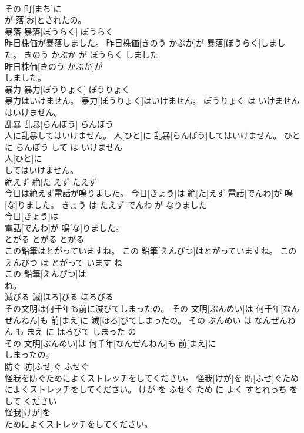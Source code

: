\documentclass[8pt]{extreport}
\begin{document}
\begin{CJK}{UTF8}{min}
\\	その 町[まち]に
\\	が 落[お]とされたの。			
\\	暴落	暴落[ぼうらく]	ぼうらく	
\\	昨日株価が暴落しました。	昨日株価[きのう かぶか]が 暴落[ぼうらく]しました。	きのう かぶか が ぼうらく しました	
\\	昨日株価[きのう かぶか]が
\\	しました。			
\\	暴力	暴力[ぼうりょく]	ぼうりょく	
\\	暴力はいけません。	暴力[ぼうりょく]はいけません。	ぼうりょく は いけません	
\\	はいけません。			
\\	乱暴	乱暴[らんぼう]	らんぼう	
\\	人に乱暴してはいけません。	人[ひと]に 乱暴[らんぼう]してはいけません。	ひと に らんぼう して は いけません	
\\	人[ひと]に
\\	してはいけません。			
\\	絶えず	絶[た]えず	たえず	
\\	今日は絶えず電話が鳴りました。	今日[きょう]は 絶[た]えず 電話[でんわ]が 鳴[な]りました。	きょう は たえず でんわ が なりました	
\\	今日[きょう]は
\\	電話[でんわ]が 鳴[な]りました。			
\\	とがる	とがる	とがる	
\\	この鉛筆はとがっていますね。	この 鉛筆[えんぴつ]はとがっていますね。	この えんぴつ は とがって います ね	
\\	この 鉛筆[えんぴつ]は
\\	ね。			
\\	滅びる	滅[ほろ]びる	ほろびる	
\\	その文明は何千年も前に滅びてしまったの。	その 文明[ぶんめい]は 何千年[なんぜんねん]も 前[まえ]に 滅[ほろ]びてしまったの。	その ぶんめい は なんぜんねん も まえ に ほろびて しまった の	
\\	その 文明[ぶんめい]は 何千年[なんぜんねん]も 前[まえ]に
\\	しまったの。			
\\	防ぐ	防[ふせ]ぐ	ふせぐ	
\\	怪我を防ぐためによくストレッチをしてください。	怪我[けが]を 防[ふせ]ぐためによくストレッチをしてください。	けが を ふせぐ ため に よく すとれっち を して ください	
\\	怪我[けが]を
\\	ためによくストレッチをしてください。			

\end{CJK}
\end{document}

